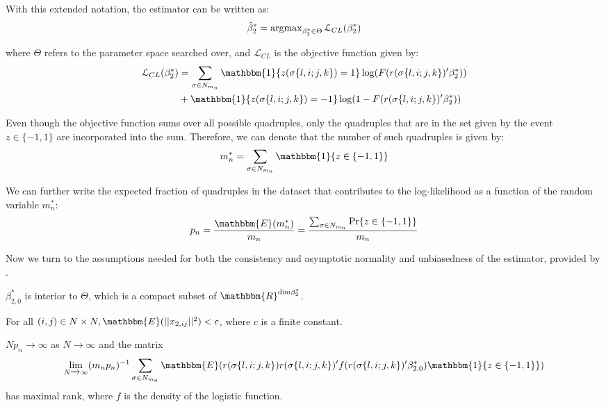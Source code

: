With this extended notation, the estimator can be written as:
\begin{align*}
    \hat{\beta}_2^* = \operatorname{argmax}_{\beta_2^* \in \Theta} \mathcal{L}_{CL}(\beta_2^*)
\end{align*}

\noindent where $\Theta$ refers to the parameter space searched over, and $\mathcal{L}_{CL}$ is the objective function given by:
\begin{align*}
    \mathcal{L}_{CL}(\beta_2^*) &= \sum_{\sigma \in N_{m_n}} \mathbbm{1}\{ z(\sigma\{l,i;j,k\}) = 1\} \log (F(r(\sigma\{l,i;j,k\})'\beta_2^*)) \\ &+ \mathbbm{1}\{ z(\sigma\{l,i;j,k\}) = -1\} \log (1 - F(r(\sigma\{l,i;j,k\})'\beta_2^*))
\end{align*}

Even though the objective function sums over all possible quadruples, only the quadruples that are in the set given by the event $z \in \{-1,1\}$ are incorporated into the sum. Therefore, we can denote that the number of such quadruples is given by:
\begin{align*}
    m_n^* = \sum_{\sigma \in N_{m_n}} \mathbbm{1}\{ z \in \{-1,1\}\}
\end{align*}

We can further write the expected fraction of quadruples in the dataset that contributes to the log-likelihood as a function of the random variable $m_n^*$:
\begin{align*}
    p_n = \frac{\mathbbm{E}(m_n^*)}{m_n} = \frac{\sum_{\sigma \in N_{m_n}} \text{Pr}\{ z \in \{-1,1\}\}}{m_n}
\end{align*}

Now we turn to the assumptions needed for both the consistency and asymptotic normality and unbiasedness of the estimator, provided by \cite{jochmans2018semiparametric}.

\begin{assumption} \label{ass_jochmans1}
    $\beta_{2,0}^*$ is interior to $\Theta$, which is a compact subset of $\mathbbm{R}^{\text{dim} \beta_2^*}$.
\end{assumption}

\begin{assumption} \label{ass_jochmans2}
    For all $(i,j) \in N \times N, \mathbbm{E}(\rvert \rvert x_{2,ij} \rvert \rvert^2) < c$, where $c$ is a finite constant.
\end{assumption}

\begin{assumption} \label{ass_jochmans3}
    $Np_n \xrightarrow{} \infty$ as $N \xrightarrow{} \infty$ and the matrix
    $$ \lim_{N \xrightarrow{} \infty} (m_n p_n)^{-1} \sum_{\sigma \in N_{m_n}} \mathbbm{E} (r(\sigma\{l,i;j,k\}) r(\sigma\{l,i;j,k\})' f(r(\sigma\{l,i;j,k\})' \beta_{2,0}^*) \mathbbm{1}\{ z \in \{-1,1\}\}) $$
    has maximal rank, where $f$ is the density of the logistic function.
\end{assumption}

